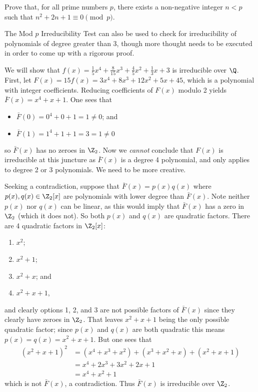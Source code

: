 \begin{exercise}
    Prove that, for all prime numbers $p$, there exists a non-negative integer $n < p$ such that $n^2 + 2n + 1 \equiv 0 \pmod{p}$.
\end{exercise}

The Mod $p$ Irreducibility Test can also be used to check for irreducibility of polynomials of degree greater than 3, though more thought needs to be executed in order to come up with a rigorous proof.

\begin{example}
    We will show that $f(x) = \frac15x^4 + \frac8{15}x^3 + \frac45x^2 + \frac13x + 3$ is irreducible over $\Q$. First, let $F(x) = 15f(x) = 3x^4 + 8x^3 + 12x^2 + 5x + 45$, which is a polynomial with integer coefficients. Reducing coefficients of $F(x)$ modulo 2 yields $\bar{F}(x) = x^4 + x + 1$. One sees that
    \begin{itemize}
        \item $\bar{F}(0) = 0^4 + 0 + 1 = 1 \neq 0$; and
        \item $\bar{F}(1) = 1^4 + 1 + 1 = 3 = 1 \neq 0$
    \end{itemize}
    so $\bar{F}(x)$ has no zeroes in $\Z_2$. Now we \textit{cannot} conclude that $F(x)$ is irreducible at this juncture as $\bar{F}(x)$ is a degree 4 polynomial, and  only applies to degree 2 or 3 polynomials. We need to be more creative.

    Seeking a contradiction, suppose that $\bar{F}(x) = p(x)q(x)$ where $p(x), q(x) \in \Z_2[x]$ are polynomials with lower degree than $\bar{F}(x)$. Note neither $p(x)$ nor $q(x)$ can be linear, as this would imply that $\bar{F}(x)$ has a zero in $\Z_2$ (which it does not). So both $p(x)$ and $q(x)$ are quadratic factors. There are 4 quadratic factors in $\Z_2[x]$:
    \begin{enumerate}
        \item $x^2$;
        \item $x^2 + 1$;
        \item $x^2 + x$; and
        \item $x^2 + x + 1$,
    \end{enumerate}
    and clearly options 1, 2, and 3 are not possible factors of $\bar{F}(x)$ since they clearly have zeroes in $\Z_2$. That leaves $x^2 + x + 1$ being the only possible quadratic factor; since $p(x)$ and $q(x)$ are both quadratic this means $p(x) = q(x) = x^2 + x + 1$. But one sees that
    \begin{align*}
        (x^2 + x + 1)^2 &= (x^4 + x^3 + x^2) + (x^3 + x^2 + x) + (x^2 + x + 1)\\
        &= x^4 + 2x^3 + 3x^2 + 2x + 1\\
        &= x^4 + x^2 + 1
    \end{align*}
    which is not $\bar{F}(x)$, a contradiction. Thus $\bar{F}(x)$ is irreducible over $\Z_2$.


\end{example}
